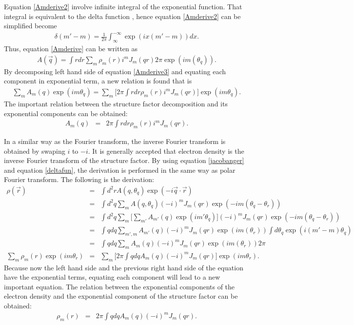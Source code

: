 Equation \ref{Amderive2} involve infinite integral of the exponential function. That integral is equivalent to the delta function \cite{deltafunction}, hence equation \ref{Amderive2} can be simplified become
\begin{eqnarray}
\label{deltafun}
\delta(m'-m)=\frac{1}{2 \pi} \int_{\infty}^{-\infty} \exp(i x(m'-m)) dx .
\end{eqnarray}
Thus, equation \ref{Amderive} can be written as
\begin{eqnarray}
\label{Amderive3}
A(\vec{q}) = \int r dr \sum_{m} \rho_m(r) i^m J_{m}(q r) 2 \pi \exp(i m ( \theta_{q})) . 
\end{eqnarray}
By decomposing left hand side of equation \ref{Amderive3} and equating each component in exponential term, a new relation is found that is 
\begin{eqnarray}
\sum_{m} A_{m}(q) \exp(i m \theta_{q}) = \sum_{m} \bigg[ 2 \pi \int r dr \rho_{m}(r) i^{m} J_{m}(q r) \bigg] \exp(i m \theta_{q}).  
\end{eqnarray}
The important relation between the structure factor decomposition and its exponential components can be obtained:
\begin{eqnarray}
\label{Am}
A_{m}(q) &=& 2 \pi \int rdr  \rho_{m}(r) i^m J_{m}(q r) .
\end{eqnarray}

In a similar way as the Fourier transform, the inverse Fourier transform is obtained by swaping $i$ to $-i$. It is generally accepted that electron density is the inverse Fourier transform of the structure factor. By using equation \ref{jacobanger} and equation \ref{deltafun}, the derivation is performed in the same way as polar Fourier transform. The following is the derivation:
\begin{eqnarray*}
\rho(\vec{r}) &=& \int d^{2}r A(q,\theta_{q}) \exp(-i \vec{q} \cdot \vec{r})  \\
&=& \int d^{2}q \sum_{m} A(q,\theta_{q}) (-i)^m J_{m}(q r) \exp(-i m ( \theta_{q}-\theta_{r} )) \\
&=& \int d^{2}q \sum_{m} \bigg[\sum_{m'} A_{m'}(q) \exp(i m' \theta_{q}) \bigg] (-i)^m J_{m}(q r) \exp(-i m ( \theta_{q}-\theta_{r} )) \\
&=& \int q dq \sum_{m',m} A_{m'}(q) (-i)^m J_{m}(q r) \exp(i m ( \theta_{r})) \int d\theta_{q} \exp(i (m'-m) \theta_{q}) \\
&=& \int q dq \sum_{m} A_m(q) (-i)^m J_{m}(q r) \exp(i m ( \theta_{r})) 2 \pi \\
\sum_{m} \rho_{m}(r) \exp(i m \theta_{r}) &=& \sum_{m} \bigg[ 2 \pi \int q dq A_{m}(q) (-i)^{m} J_{m}(q r) \bigg] \exp(i m \theta_{r}). 
\end{eqnarray*}
Because now the left hand side and the previous right hand side of the equation have the exponential terms, equating each component will lead to a new important equation. The relation between the exponential components of the electron density and the exponential component of the structure factor can be obtained: 
\begin{eqnarray}
\label{rhom}
\rho_{m}(r) &=& 2 \pi \int qdq  A_{m}(q) (-i)^m J_{m}(q r).
\end{eqnarray}

